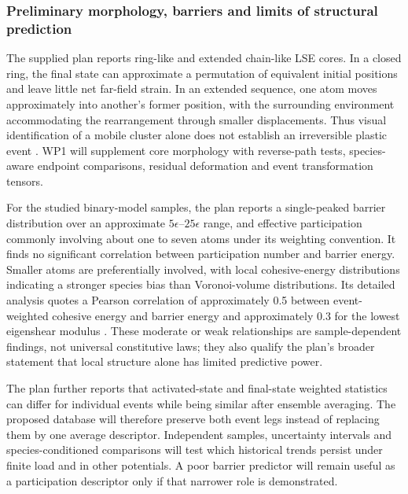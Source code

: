\documentclass[11pt,a4paper]{article}
\begin{document}
\subsubsection{Preliminary morphology, barriers and limits of structural prediction}
The supplied plan reports ring-like and extended chain-like LSE cores. In a closed ring, the final state can approximate a permutation of equivalent initial positions and leave little net far-field strain. In an extended sequence, one atom moves approximately into another's former position, with the surrounding environment accommodating the rearrangement through smaller displacements. Thus visual identification of a mobile cluster alone does not establish an irreversible plastic event \cite{swayplan}. WP1 will supplement core morphology with reverse-path tests, species-aware endpoint comparisons, residual deformation and event transformation tensors.

For the studied binary-model samples, the plan reports a single-peaked barrier distribution over an approximate $5\epsilon$--$25\epsilon$ range, and effective participation commonly involving about one to seven atoms under its weighting convention. It finds no significant correlation between participation number and barrier energy. Smaller atoms are preferentially involved, with local cohesive-energy distributions indicating a stronger species bias than Voronoi-volume distributions. Its detailed analysis quotes a Pearson correlation of approximately 0.5 between event-weighted cohesive energy and barrier energy and approximately 0.3 for the lowest eigenshear modulus \cite{swayplan}. These moderate or weak relationships are sample-dependent findings, not universal constitutive laws; they also qualify the plan's broader statement that local structure alone has limited predictive power.

The plan further reports that activated-state and final-state weighted statistics can differ for individual events while being similar after ensemble averaging. The proposed database will therefore preserve both event legs instead of replacing them by one average descriptor. Independent samples, uncertainty intervals and species-conditioned comparisons will test which historical trends persist under finite load and in other potentials. A poor barrier predictor will remain useful as a participation descriptor only if that narrower role is demonstrated.
\end{document}
